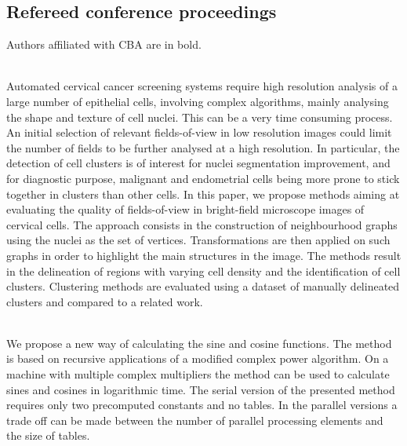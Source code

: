 {{\begin{enumerate}
\end{enumerate}

\newpage 
\subsection{Refereed conference proceedings}\label{sect:rev-conf}
Authors affiliated with CBA are in bold.
{\small
\begin{enumerate}


\\ \aabstract
 Automated cervical cancer screening systems require high resolution analysis of a large number of epithelial cells, involving complex algorithms, mainly analysing the shape and texture of cell nuclei. This can be a very time consuming process. An initial selection of relevant fields-of-view in low resolution images could limit the number of fields to be further analysed at a high resolution. In particular, the detection of cell clusters is of interest for nuclei segmentation improvement, and for diagnostic purpose, malignant and endometrial cells being more prone to stick together in clusters than other cells. In this paper, we propose methods aiming at evaluating the quality of fields-of-view in bright-field microscope images of cervical cells. The approach consists in the construction of neighbourhood graphs using the nuclei as the set of vertices. Transformations are then applied on such graphs in order to highlight the main structures in the image. The methods result in the delineation of regions with varying cell density and the identification of cell clusters. Clustering methods are evaluated using a dataset of manually delineated clusters and compared to a related work.


\\ \aabstract
We propose a new way of calculating the sine and cosine functions. The method is based on recursive applications of a modified complex power algorithm. On a machine with multiple complex multipliers the method can be used to calculate sines and cosines in logarithmic time. The serial version of the presented method requires only two precomputed constants and no tables. In the parallel versions a trade off can be made between the number of parallel processing elements and the size of tables.


\end{enumerate}}}}
